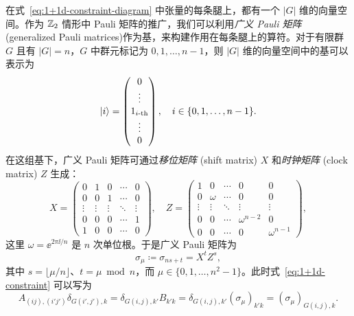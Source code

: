 在式~\eqref{eq:1+1d-constraint-diagram} 中张量的每条腿上，都有一个 $|G|$ 维的向量空间。作为 $\mathbb{Z}_2$ 情形中 Pauli 矩阵的推广，我们可以利用\emph{广义 Pauli 矩阵} (generalized Pauli matrices)\cite{patera1988pauli}作为基，来构建作用在每条腿上的算符。对于有限群 $G$ 且有 $|G|=n$，$G$ 中群元标记为 $0,1,\dots,n-1$，则 $|G|$ 维的向量空间中的基可以表示为
\begin{equation}
  \ket{i} = \begin{pmatrix} 0 \\ \vdots \\ 1_{\text{$i$-th}} \\ \vdots \\ 0 \end{pmatrix}, \quad
  i \in \{ 0, 1, \dots, n-1 \}.
\end{equation}
在这组基下，广义 Pauli 矩阵可通过\emph{移位矩阵} (shift matrix) $X$ 和\emph{时钟矩阵} (clock matrix) $Z$ 生成：
\begin{equation}
  X = \begin{pmatrix}
    0      & 1      & 0      & \cdots & 0      \\
    0      & 0      & 1      & \cdots & 0      \\
    \vdots & \vdots & \vdots & \ddots & \vdots \\
    0      & 0      & 0      & \cdots & 1      \\
    1      & 0      & 0      & \cdots & 0
  \end{pmatrix}, \quad
  Z = \begin{pmatrix}
    1      & 0      & \cdots & 0            & 0      \\
    0      & \omega & \cdots & 0            & 0      \\
    \vdots & \vdots & \ddots & \vdots       & \vdots \\
    0      & 0      & \cdots & \omega^{n-2} & 0      \\
    0      & 0      & \cdots & 0            & \omega^{n-1}
  \end{pmatrix},
  \label{eq:generalized-pauli-matrices}
\end{equation}
这里 $\omega=\ee^{2\pi\ii/n}$ 是 $n$ 次单位根。于是广义 Pauli 矩阵为
\begin{equation}
  \sigma_\mu \coloneq \sigma_{ns+t} = X^t Z^s,
\end{equation}
其中 $s=\lfloor\mu/n\rfloor$、$t=\mu\bmod n$，而 $\mu\in\{0,1,\dots,n^2-1\}$。此时式~\eqref{eq:1+1d-constraint} 可以写为
\begin{equation}
    A_{(ij), (i'j')} \delta_{G(i',j'), k}
  = \delta_{G(i,j), k'} B_{k'k}
  = \delta_{G(i,j), k'} (\sigma_\mu)_{k'k}
  = (\sigma_\mu)_{G(i,j), k}.
\end{equation}
